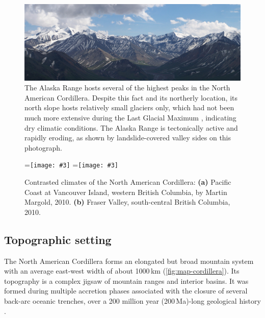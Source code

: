 \documentclass[a4paper]{kappa}
\newcommand{\subgraphics}[3][,]{%
  \setbox1=\hbox{\texttt{[image: \#3]}}%
  \leavevmode\rlap{\usebox1}%
  \rlap{\hspace*{0.25em}
        \raisebox{\dimexpr\ht1-3ex}{\textbf{(#2)}}}%
  \phantom{\usebox1}%
}
\begin{document}
\begin{figure}
  \includegraphics{photo-alaska-range}
  \caption{The Alaska Range hosts several of the highest peaks in the North
           American Cordillera. Despite this fact and its northerly location,
           its north slope hosts relatively small glaciers only, which had not
           been much more extensive during the Last Glacial Maximum
           \citep{Kaufman.Manley.2004}, indicating dry climatic conditions.
           The Alaska Range is tectonically active and rapidly eroding, as
           shown by landslide-covered valley sides on this photograph.}
  \label{fig:photo-alaska-range}
\end{figure}

\begin{figure}
  \subgraphics{a}{photo-vancouver-island}%
  \hspace{1cm}%
  \subgraphics{b}{photo-fraser-valley}%
  \caption{Contrasted climates of the North American Cordillera:
           \textbf{(a)} Pacific Coast at Vancouver Island, western British
           Columbia, by Martin Margold, 2010.
           \textbf{(b)} Fraser Valley, south-central British Columbia, 2010.}
  \label{fig:photo-fraser-valley}
\end{figure}

\subsection{Topographic setting}

The North American Cordillera forms an elongated but broad mountain system with
an average east-west width of about 1000\,km (\cref{fig:map-cordillera}). Its
topography is a complex jigsaw of mountain ranges and interior basins. It was
formed during multiple accretion phases associated with the closure of several
back-arc oceanic trenches, over a 200 million year (200\,Ma)-long geological
history \citep{Sigloch.Mihalynuk.2013}.
\end{document}
